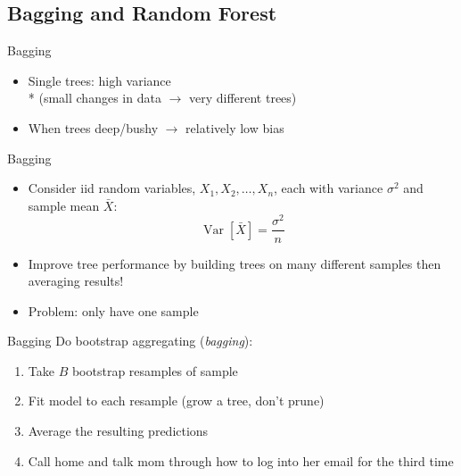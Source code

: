 \documentclass{beamer}
\begin{document}

\subsection{Bagging and Random Forest} %
\label{sub:bagging_and_random}

\begin{frame}{Bagging}
  
  \begin{itemize}[<+->]
    \item Single trees: high variance \\* 
    (small changes in data $\rightarrow$ very different trees)
    \item When trees deep/bushy $\rightarrow$ relatively low bias 
  \end{itemize}
\end{frame}

\begin{frame}{Bagging}
  \begin{itemize}[<+->]
    \item Consider iid random variables, $X_{1}, X_{2}, \ldots, X_{n}$, each with variance $\sigma^2$ and sample mean $\bar{X}$:
  \begin{equation*}
    \operatorname{Var}[\bar{X}] = \frac{\sigma^2}{n}
  \end{equation*}
  \item Improve tree performance by building trees on many different samples then averaging results!
  \item Problem: only have one sample
  \end{itemize}
\end{frame}

\begin{frame}[c]{Bagging}
  Do bootstrap aggregating (\emph{bagging}):
  \begin{enumerate}[<+->]
    \item Take $B$ bootstrap resamples of sample
    \item Fit model to each resample (grow a tree, don't prune)
    \item Average the resulting predictions
    \item Call home and talk mom through how to log into her email for the third time
  \end{enumerate}
\end{frame}
\end{document}
